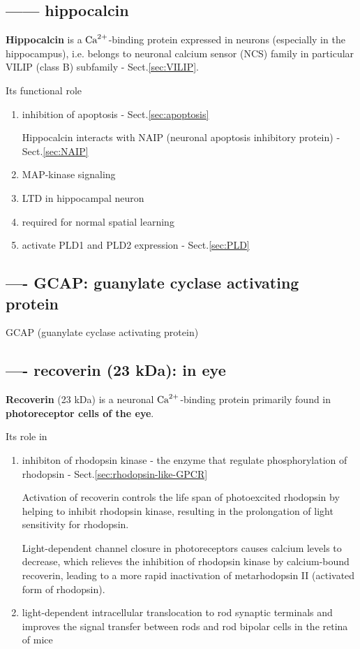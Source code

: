 \subsection{------ hippocalcin}
\label{sec:hippocalcin}

{\bf Hippocalcin} is a ${\text{Ca}^{2+}}$-binding protein expressed in neurons (especially
in the hippocampus), i.e. belongs to neuronal calcium sensor (NCS) family in
particular VILIP (class B) subfamily - Sect.\ref{sec:VILIP}.

Its functional role
\begin{enumerate}
  \item inhibition of apoptosis - Sect.\ref{sec:apoptosis}
  
  Hippocalcin interacts with NAIP (neuronal apoptosis inhibitory protein) -
  Sect.\ref{sec:NAIP}
  
  \item MAP-kinase signaling
  
  \item LTD in hippocampal neuron
  
  \item required for normal spatial learning
  
  \item activate PLD1 and PLD2 expression  - Sect.\ref{sec:PLD}
\end{enumerate}

\subsection{---- GCAP: guanylate cyclase activating protein}
\label{sec:GCAP}

GCAP (guanylate cyclase activating protein)

\subsection{---- recoverin (23 kDa): in eye}
\label{sec:recoverin}

{\bf Recoverin} (23 kDa) is a neuronal ${\text{Ca}^{2+}}$-binding protein
primarily found in {\bf photoreceptor cells of the eye}.

Its role in 
\begin{enumerate}
  \item inhibiton of rhodopsin kinase - the enzyme that regulate
  phosphorylation of rhodopsin - Sect.\ref{sec:rhodopsin-like-GPCR}
  
 Activation of recoverin controls the life span of photoexcited rhodopsin by
 helping to inhibit rhodopsin kinase, resulting in the prolongation of light
 sensitivity for rhodopsin.
 
 Light-dependent channel closure in photoreceptors causes calcium levels to
 decrease, which relieves the inhibition of rhodopsin kinase by calcium-bound
 recoverin, leading to a more rapid inactivation of metarhodopsin II (activated
 form of rhodopsin).
  
  \item light-dependent intracellular translocation to rod synaptic terminals
  and improves the signal transfer between rods and rod bipolar cells in the
  retina of mice 
\end{enumerate}


